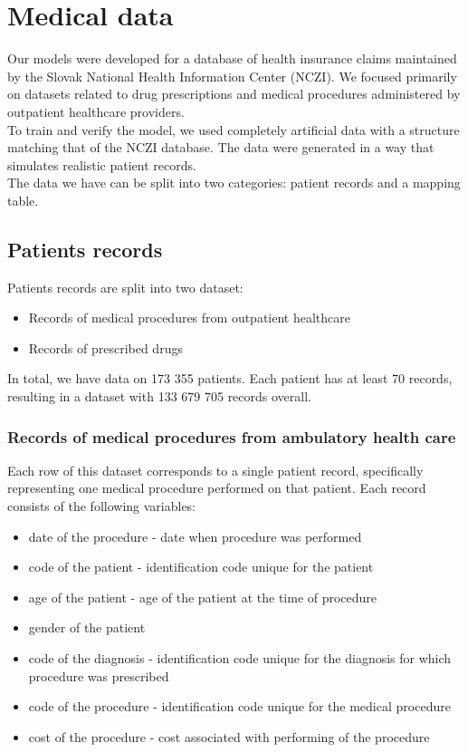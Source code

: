 
\chapter{Medical data} \label{chap:data}

Our models were developed for a database of health insurance claims maintained by the Slovak National Health Information Center (NCZI). We focused primarily on datasets related to drug prescriptions and medical procedures administered by outpatient healthcare providers.
\\

To train and verify the model, we used completely artificial data with a structure matching that of the NCZI database. The data were generated in a way that simulates realistic patient records.
\\

The data we have can be split into two categories: patient records and a mapping table.

\section{Patients records}

Patients records are split into two dataset:
\begin{itemize}
	\item Records of medical procedures from outpatient healthcare
	\item Records of prescribed drugs
\end{itemize}

In total, we have data on 173 355 patients. Each patient has at least 70 records, resulting in a dataset with 133 679 705 records overall. 

\subsection{Records of medical procedures from ambulatory health care}

Each row of this dataset corresponds to a single patient record, specifically representing one medical procedure performed on that patient. Each record consists of the following variables:

\begin{itemize}
	\item date of the procedure - date when procedure was performed
	\item code of the patient - identification code unique for the patient
	\item age of the patient - age of the patient at the time of procedure
	\item gender of the patient
	\item code of the diagnosis - identification code unique for the diagnosis for which procedure was prescribed
	\item code of the procedure - identification code unique for the medical procedure 
	\item cost of the procedure - cost associated with performing of the procedure
\end{itemize}

